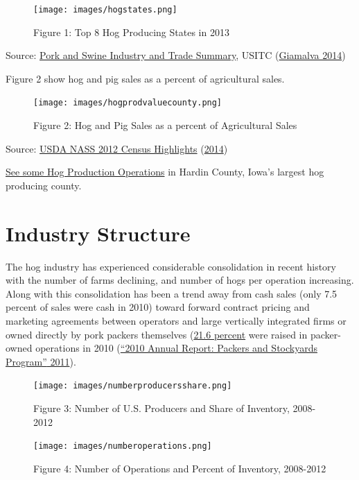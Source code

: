 \documentclass[
]{book}
\begin{document}
\begin{figure}
\centering
\texttt{[image: images/hogstates.png]}
\caption{Figure 1: Top 8 Hog Producing States in 2013}
\end{figure}

Source: \href{pdf-Readings/pork_and_swine_summary.pdf}{Pork and Swine Industry and Trade Summary}, USITC (\protect\hyperlink{ref-usitctrade}{Giamalva 2014})

Figure 2 show hog and pig sales as a percent of agricultural sales.

\begin{figure}
\centering
\texttt{[image: images/hogprodvaluecounty.png]}
\caption{Figure 2: Hog and Pig Sales as a percent of Agricultural Sales}
\end{figure}

Source: \href{pdf-Readings/12CensusHighlightsHogs.pdf}{USDA NASS 2012 Census Highlights} (\protect\hyperlink{ref-usdacensus}{2014})

\href{https://www.google.com/maps/place/Hardin+County,+IA/@42.3833668,-93.3907209,60627m/data=!3m2!1e3!4b1!4m2!3m1!1s0x87ee2ed39f2db5df:0x67a785cf003d5369!6m1!1e1}{See some Hog Production Operations} in Hardin County, Iowa's largest hog producing county.

\hypertarget{industry-structure}{%
\section{Industry Structure}\label{industry-structure}}

The hog industry has experienced considerable consolidation in recent history with the number of farms declining, and number of hogs per operation increasing. Along with this consolidation has been a trend away from cash sales (only 7.5 percent of sales were cash in 2010) toward forward contract pricing and marketing agreements between operators and large vertically integrated firms or owned directly by pork packers themselves (\href{pdf-readings/gipsa10.pdf}{21.6 percent} were raised in packer-owned operations in 2010 (\protect\hyperlink{ref-gipsa10}{{``2010 Annual Report: Packers and Stockyards Program''} 2011}).

\begin{figure}
\centering
\texttt{[image: images/numberproducersshare.png]}
\caption{Figure 3: Number of U.S. Producers and Share of Inventory, 2008-2012}
\end{figure}

\begin{figure}
\centering
\texttt{[image: images/numberoperations.png]}
\caption{Figure 4: Number of Operations and Percent of Inventory, 2008-2012}
\end{figure}
\end{document}
